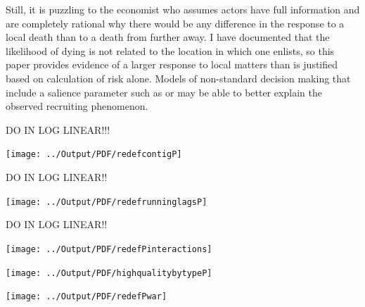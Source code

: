 \documentclass[12pt] {article}
\begin{document}
Still, it is puzzling to the economist who assumes actors have full
information and are completely rational why there would be any difference
in the response to a local death than to a death from further away.
I have documented that the likelihood of dying is not related to the
location in which one enlists, so this paper provides evidence of
a larger response to local matters than is justified based on calculation
of risk alone. Models of non-standard decision making that include
a salience parameter such as \cite{ChettySalience} or \cite{eBayEarly}
may be able to better explain the observed recruiting phenomenon. 

\newpage



\pagebreak{}
\begin{table}
\caption{DO IN LOG LINEAR!!!}
\label{Flo:Media}\texttt{[image: ../Output/PDF/redefcontigP]}
\end{table}

\clearpage{}
\pagebreak{}
\begin{table}
\caption{DO IN LOG LINEAR!!}
\label{Flo:Cumulative Lags}\texttt{[image: ../Output/PDF/redefrunninglagsP]}
\end{table}

\clearpage{}
\pagebreak{}
\begin{table}
\caption{DO IN LOG LINEAR!!}
\label{Flo:Poisson Interactions}\texttt{[image: ../Output/PDF/redefPinteractions]}
\end{table}



\pagebreak{}
\begin{table}
\caption{}
\label{Flo: Recs by Quality}\texttt{[image: ../Output/PDF/highqualitybytypeP]}
\end{table}



\pagebreak{}
\begin{table}
\caption{}
\label{Flo:Deaths by War}
\texttt{[image: ../Output/PDF/redefPwar]}
\end{table}



\clearpage{}

\end{document}
